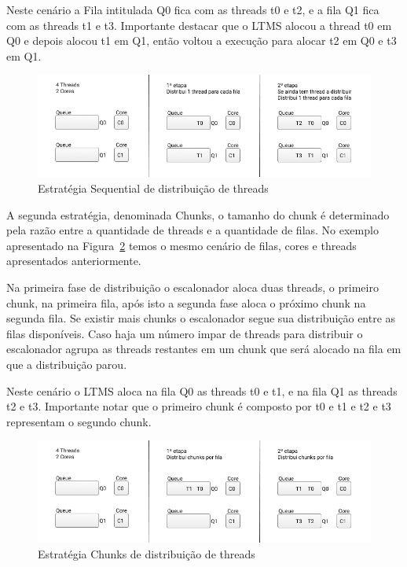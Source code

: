 \documentclass[diss,capa]{texufpel}
\begin{document}
Neste cenário a Fila intitulada Q0 fica com as threads t0 e t2, e a fila Q1 fica com as threads t1 e t3. Importante destacar que o LTMS alocou a thread t0 em Q0 e depois alocou t1 em Q1, então voltou a execução para alocar t2 em Q0 e t3 em Q1.

\begin{figure}[htbp]
\centering
\includegraphics[scale=.6]{images/Queue_one.png}
\caption{Estratégia Sequential de distribuição de threads}
\label{sequential}
\end{figure}

A segunda estratégia, denominada Chunks, o tamanho do chunk é determinado pela razão entre a quantidade de threads e a quantidade de filas. No exemplo apresentado na Figura~\ref{chunks} temos o mesmo cenário de filas, cores e threads apresentados anteriormente.

Na primeira fase de distribuição o escalonador aloca duas threads, o primeiro chunk, na primeira fila, após isto a segunda fase aloca o próximo chunk na segunda fila. Se existir mais chunks o escalonador segue sua distribuição entre as filas disponíveis. Caso haja um número impar de threads para distribuir o escalonador agrupa as threads restantes em um chunk que será alocado na fila em que a distribuição parou.

Neste cenário o LTMS aloca na fila Q0 as threads t0 e t1, e na fila Q1 as threads t2 e t3. Importante notar que o primeiro chunk é composto por t0 e t1 e t2 e t3 representam o segundo chunk.

\begin{figure}[htbp]
\centering
\includegraphics[scale=.6]{images/Queue_chunks.png}
\caption{Estratégia Chunks de distribuição de threads}
\label{chunks}
\end{figure}
\end{document}
